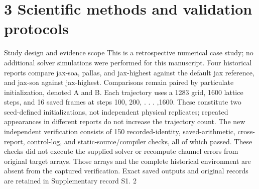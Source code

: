 \documentclass[11pt]{article}
\begin{document}
\section*{3 Scientific methods and validation protocols}

Study design and evidence scope
This is a retrospective numerical case study; no additional solver simulations were performed for
this manuscript. Four historical reports compare jax-soa, pallas, and jax-highest against
the default jax reference, and jax-soa against jax-highest. Comparisons remain paired by
particulate initialization, denoted A and B. Each trajectory uses a 1283 grid, 1600 lattice steps,
and 16 saved frames at steps 100, 200, . . . ,1600. These constitute two seed-defined initializations,
not independent physical replicates; repeated appearances in different reports do not increase the
trajectory count.
The new independent verification consists of 150 recorded-identity, saved-arithmetic, cross-report,
control-log, and static-source/compiler checks, all of which passed. These checks did not execute
the supplied solver or recompute channel errors from original target arrays. Those arrays and the
complete historical environment are absent from the captured verification. Exact saved outputs
and original records are retained in Supplementary record S1.
2
\end{document}
